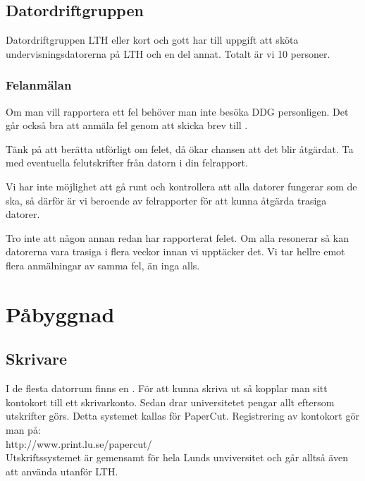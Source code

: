 \documentclass[a4paper,twocolumn]{book}
\begin{document}
\section{Datordriftgruppen}

Datordriftgruppen LTH eller kort och gott
 har till uppgift att sköta undervisningsdatorerna på
LTH och en del annat. Totalt är vi 10 personer. 

\subsection{Felanmälan}
Om man vill rapportera ett fel behöver man inte besöka DDG
personligen. Det går också bra att anmäla fel genom att skicka brev till
. 

Tänk på att berätta utförligt om felet, då ökar chansen att det blir
åtgärdat. Ta med eventuella felutskrifter från datorn i din
felrapport.

Vi har inte möjlighet att gå runt och kontrollera att alla datorer
fungerar som de ska, så därför är vi beroende av felrapporter för att
kunna åtgärda trasiga datorer.

Tro inte att någon annan redan har rapporterat felet. Om alla
resonerar så kan datorerna vara trasiga i flera veckor innan vi
upptäcker det. Vi tar hellre emot flera anmälningar av samma fel, än
inga alls.


\chapter{Påbyggnad}
\label{cha:pabyggnad}

\section{Skrivare}

\label{sec:skrivare}
I de flesta datorrum finns en .
För att kunna skriva ut så kopplar man sitt kontokort till ett skrivarkonto. 
Sedan drar universitetet pengar allt eftersom utskrifter görs. Detta systemet kallas för PaperCut. Registrering av kontokort gör man på: \\
http://www.print.lu.se/papercut/ \\
Utskriftssystemet är gemensamt för hela Lunds 
unviversitet och går alltså även att använda utanför LTH.
\end{document}
